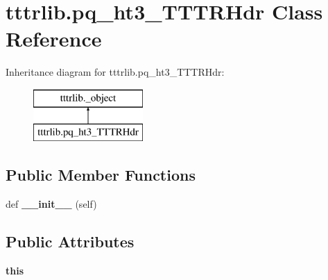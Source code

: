 \hypertarget{classtttrlib_1_1pq__ht3___t_t_t_r_hdr}{}\section{tttrlib.\+pq\+\_\+ht3\+\_\+\+T\+T\+T\+R\+Hdr Class Reference}
\label{classtttrlib_1_1pq__ht3___t_t_t_r_hdr}
Inheritance diagram for tttrlib.\+pq\+\_\+ht3\+\_\+\+T\+T\+T\+R\+Hdr\+:\begin{figure}[H]
\begin{center}
\leavevmode
\includegraphics[height=2.000000cm]{classtttrlib_1_1pq__ht3___t_t_t_r_hdr}
\end{center}
\end{figure}
\subsection*{Public Member Functions}
\begin{DoxyCompactItemize}
\item 
\mbox{\label{classtttrlib_1_1pq__ht3___t_t_t_r_hdr_aef793503871bb05b882d9955309dd09b}} 
def {\bfseries \+\_\+\+\_\+init\+\_\+\+\_\+} (self)
\end{DoxyCompactItemize}
\subsection*{Public Attributes}
\begin{DoxyCompactItemize}
\item 
\mbox{\label{classtttrlib_1_1pq__ht3___t_t_t_r_hdr_a23baf587242c8a418ade79922bba4404}} 
{\bfseries this}
\end{DoxyCompactItemize}
